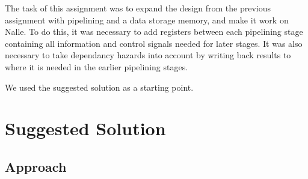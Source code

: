 \documentclass[11pt]{report}
\begin{document}
The task of this assignment was to expand the design from the previous
assignment with pipelining and a data storage memory, and make it work
on Nalle. To do this, it
was necessary to add registers between each pipelining stage containing
all information and control signals needed for later stages. It was also
necessary to take dependancy hazards into account by writing back results
to where it is needed in the earlier pipelining stages. 

We used the suggested solution as a starting point. %

\section*{Suggested Solution}


\subsection*{Approach}

\end{document}
